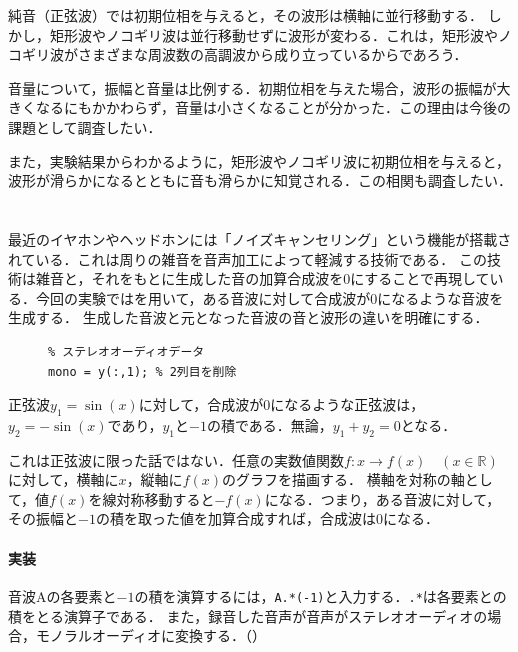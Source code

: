 \consideration
純音（正弦波）では初期位相を与えると，その波形は横軸に並行移動する．
しかし，矩形波やノコギリ波は並行移動せずに波形が変わる．これは，矩形波やノコギリ波がさまざまな周波数の高調波から成り立っているからであろう．\par
音量について，振幅と音量は比例する．初期位相を与えた場合，波形の振幅が大きくなるにもかかわらず，音量は小さくなることが分かった．この理由は今後の課題として調査したい．\par
また，実験結果からわかるように，矩形波やノコギリ波に初期位相を与えると，波形が滑らかになるとともに音も滑らかに知覚される．この相関も調査したい．
\section{\kadaicb}\label{sec:\kadaicb}
\purpose
最近のイヤホンやヘッドホンには「ノイズキャンセリング」という機能が搭載されている．これは周りの雑音を音声加工によって軽減する技術である．
この技術は雑音と，それをもとに生成した音の加算合成波を\(0\)にすることで再現している．今回の実験では\matlab を用いて，ある音波に対して合成波が\(0\)になるような音波を生成する．
生成した音波と元となった音波の音と波形の違いを明確にする．
\method
\begin{figure}
    \vspace{-1cm}
    \centering
    \begin{lstlisting}[caption={モノラルへの変換},label={src:モノラルへの変換},numbers={none}]
% y : N行2列
% ステレオオーディオデータ
mono = y(:,1); % 2列目を削除
    \end{lstlisting}
    \vspace{-1cm}
\end{figure}
正弦波\(y_1=\sin(x)\)に対して，合成波が\(0\)になるような正弦波は，\(y_2=-\sin(x)\)であり，\(y_1\)と\(-1\)の積である．無論，\(y_1+y_2=0\)となる．\par
これは正弦波に限った話ではない．任意の実数値関数\(f:x\longrightarrow f(x)\quad(x\in\mathbb{R})\)に対して，横軸に\(x\)，縦軸に\(f(x)\)のグラフを描画する．
横軸を対称の軸として，値\(f(x)\)を線対称移動すると\(-f(x)\)になる．つまり，ある音波に対して，その振幅と\(-1\)の積を取った値を加算合成すれば，合成波は\(0\)になる．
\paragraph{実装}
音波Aの各要素と\(-1\)の積を演算するには，\texttt{A.*(-1)}と入力する．\texttt{.*}は各要素との積をとる演算子である．
また，録音した音声が音声がステレオオーディオの場合，モノラルオーディオに変換する．（）
